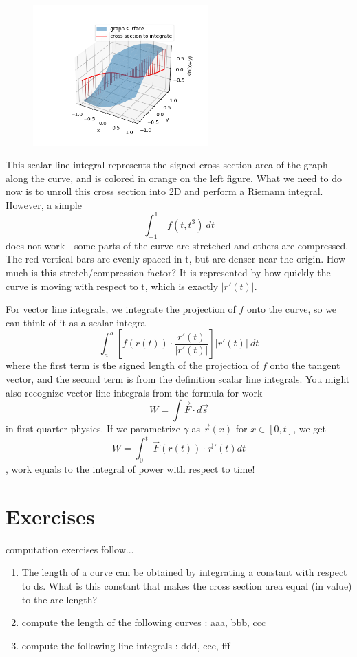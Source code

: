 \documentclass[11pt,openany]{book}
\newcommand*{\exercises}{\section*{\exercisename}}
\newcommand{\exercisename}{Exercises}
\begin{document}
	\begin{figure} 
		\centering
		\includegraphics[width=0.6\textwidth]{sin.png}
	\end{figure}
	This scalar line integral represents the signed cross-section area of the graph along the curve, and is colored in orange on the left figure.
	What we need to do now is to unroll this cross section into 2D and perform a Riemann integral. However, a simple 
	\[
		\int_{-1}^{1} \ f(t,t^3) \ dt
	\]
	does not work - some parts of the curve are stretched and others are compressed. The red vertical bars are evenly spaced in t, but are denser near the origin. How much is this stretch/compression factor? It is represented by how quickly the curve is moving with respect to t, which is exactly $|r'(t)|$.
	
	For vector line integrals, we integrate the projection of $f$ onto the curve, so we can think of it as a scalar integral \[
		\int_a^b \left[ f(r(t)) \cdot \frac{r'(t)}{|r'(t)|}  \right]   |r'(t)| \ dt
	\]
	where the first term is the signed length of the projection of $f$ onto the tangent vector, and the second term is from the definition scalar line integrals.
	You might also recognize vector line integrals from the formula for work \[
	W = \int \vec{F} \cdot d\vec{s} 
	\]
	in first quarter physics. If we parametrize $\gamma$ as $\vec{r}(x)$ for $x \in [0,t]$, we get 
	\[
		W = \int_0^t \ \vec{F}(r(t)) \cdot \vec{r}'(t) dt
	\] 
	, work equals to the integral of power with respect to time!
	
	\exercises
	computation exercises follow...
	\begin{enumerate}
		\item The length of a curve can be obtained by integrating a constant with respect to ds. What is this constant that makes the cross section area equal (in value) to the arc length? 
		\item compute the length of the following curves : aaa, bbb, ccc
		\item compute the following line integrals : ddd, eee, fff
	\end{enumerate}
	
\end{document}
